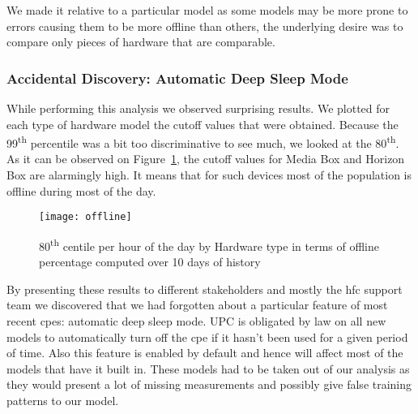 We made it relative to a particular model as some models may be more prone to errors causing them to be more offline than others, the underlying desire was to compare only pieces of hardware that are comparable. 

\subsubsection{Accidental Discovery: Automatic Deep Sleep Mode}
While performing this analysis we observed surprising results. We plotted for each type of hardware model the cutoff values that were obtained. Because the 99\textsuperscript{th} percentile was a bit too discriminative to see much, we looked at the 80\textsuperscript{th}. As it can be observed on Figure~\ref{offline}, the cutoff values for Media Box and Horizon Box are alarmingly high. It means that for such devices most of the population is offline during most of the day. 

\begin{figure}[ht]
    \begin{center}
    \texttt{[image: offline]}
    \end{center}
    \caption{80\textsuperscript{th} centile per hour of the day by Hardware type in terms of offline percentage computed over 10 days of history}
    \label{offline}
\end{figure}

By presenting these results to different stakeholders and mostly the \acrshort{hfc} support team we discovered that we had forgotten about a particular feature of most recent \acrshort{cpe}s: automatic deep sleep mode. UPC is obligated by law on all new models to automatically turn off the \acrshort{cpe} if it hasn't been used for a given period of time. Also this feature is enabled by default and hence will affect most of the models that have it built in. These models had to be taken out of our analysis as they would present a lot of missing measurements and possibly give false training patterns to our model.

